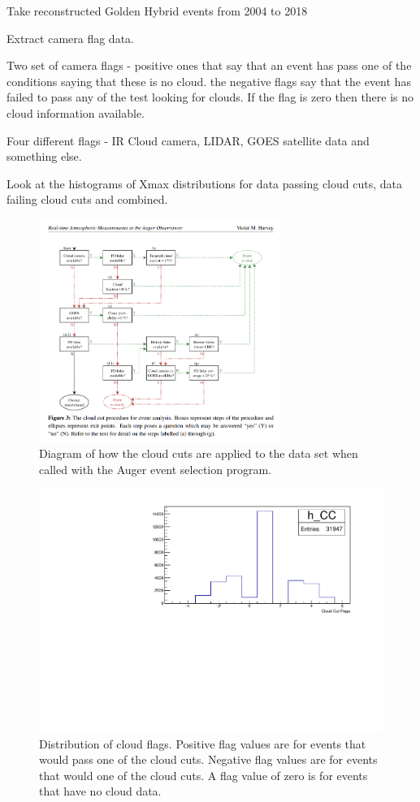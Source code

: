 Take reconstructed Golden Hybrid events from 2004 to 2018 

Extract camera flag data.

Two set of camera flags - positive ones that say that an event has pass one of the conditions saying that these is no cloud. the negative flags say that the event has failed to pass any of the test looking for clouds. If the flag is zero then there is no cloud information available.

Four different flags - IR Cloud camera, LIDAR, GOES satellite data and something else.

Look at the histograms of Xmax distributions for data passing cloud cuts, data failing cloud cuts and combined.

\begin{figure}
\centering
\includegraphics[width=0.7\textwidth]{chapters/pictures/Violet_ICRC2019_CloudCut_Diagram.png}
\caption{Diagram of how the cloud cuts are applied to the data set when called with the Auger event selection program.}
\end{figure}

\begin{figure}
\centering
\includegraphics[width=\textwidth]{chapters/graphs/CloudFlags/hist_cloudFlags.pdf}
\caption{Distribution of cloud flags. Positive flag values are for events that would pass one of the cloud cuts. Negative flag values are for events that would one of the cloud cuts. A flag value of zero is for events that have no cloud data.}
\end{figure}

